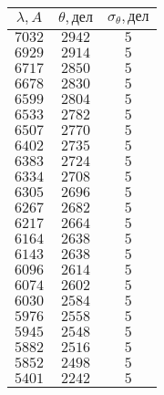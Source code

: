 \begin{tabular}{| c | c | c |}
\hline
$\lambda, A$ & $\theta, дел$ & $\sigma_{\theta}, дел$\\
\hline
$7032$ & $2942$ & $5$\\
\hline
$6929$ & $2914$ & $5$\\
\hline
$6717$ & $2850$ & $5$\\
\hline
$6678$ & $2830$ & $5$\\
\hline
$6599$ & $2804$ & $5$\\
\hline
$6533$ & $2782$ & $5$\\
\hline
$6507$ & $2770$ & $5$\\
\hline
$6402$ & $2735$ & $5$\\
\hline
$6383$ & $2724$ & $5$\\
\hline
$6334$ & $2708$ & $5$\\
\hline
$6305$ & $2696$ & $5$\\
\hline
$6267$ & $2682$ & $5$\\
\hline
$6217$ & $2664$ & $5$\\
\hline
$6164$ & $2638$ & $5$\\
\hline
$6143$ & $2638$ & $5$\\
\hline
$6096$ & $2614$ & $5$\\
\hline
$6074$ & $2602$ & $5$\\
\hline
$6030$ & $2584$ & $5$\\
\hline
$5976$ & $2558$ & $5$\\
\hline
$5945$ & $2548$ & $5$\\
\hline
$5882$ & $2516$ & $5$\\
\hline
$5852$ & $2498$ & $5$\\
\hline
$5401$ & $2242$ & $5$\\
\hline
\end{tabular}
